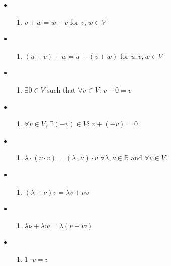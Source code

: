 \documentclass[
  letterpaper,
  DIV=11,
  numbers=noendperiod,
  oneside]{scrreprt}
\providecommand{\tightlist}{%
  \setlength{\itemsep}{0pt}\setlength{\parskip}{0pt}}\usepackage{longtable,booktabs,array}
\begin{document}
\begin{itemize}
\item
  \begin{enumerate}
  \def\labelenumi{(\Alph{enumi})}
  \setcounter{enumi}{2}
  \tightlist
  \item
    \(v + w = w + v\) for \(v,w \in V\)
  \end{enumerate}
\item
  \begin{enumerate}
  \def\labelenumi{(\Alph{enumi})}
  \tightlist
  \item
    \((u + v) + w = u + (v + w)\) for \(u,v,w \in V\)
  \end{enumerate}
\item
  \begin{enumerate}
  \def\labelenumi{(\Alph{enumi})}
  \setcounter{enumi}{13}
  \tightlist
  \item
    \(\exists 0\in V\) such that \(\forall v \in V\): \(v + 0 = v\)
  \end{enumerate}
\item
  \begin{enumerate}
  \def\labelenumi{(\Roman{enumi})}
  \tightlist
  \item
    \(\forall v \in V\), \(\exists (-v) \in V\): \(v + (-v) = 0\)
  \end{enumerate}
\item
  \begin{enumerate}
  \def\labelenumi{(\Alph{enumi})}
  \tightlist
  \item
    \(\lambda \cdot (\nu \cdot v) = (\lambda \cdot \nu) \cdot v\)
    \(\forall \lambda, \nu \in \mathbb{R}\) and \(\forall v \in V\).
  \end{enumerate}
\item
  \begin{enumerate}
  \def\labelenumi{(\Alph{enumi})}
  \setcounter{enumi}{3}
  \tightlist
  \item
    \((\lambda + \nu)v = \lambda v + \nu v\)
  \end{enumerate}
\item
  \begin{enumerate}
  \def\labelenumi{(\Alph{enumi})}
  \setcounter{enumi}{3}
  \tightlist
  \item
    \(\lambda \nu + \lambda w = \lambda(v+w)\)
  \end{enumerate}
\item
  \begin{enumerate}
  \def\labelenumi{(\Alph{enumi})}
  \setcounter{enumi}{20}
  \tightlist
  \item
    \(1\cdot v = v\)
  \end{enumerate}
\end{itemize}
\end{document}
